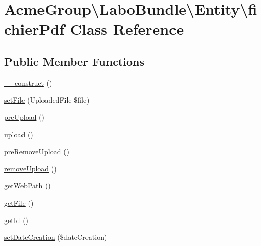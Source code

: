 \hypertarget{class_acme_group_1_1_labo_bundle_1_1_entity_1_1fichier_pdf}{\section{Acme\+Group\textbackslash{}Labo\+Bundle\textbackslash{}Entity\textbackslash{}fichier\+Pdf Class Reference}
\label{class_acme_group_1_1_labo_bundle_1_1_entity_1_1fichier_pdf}
}
\subsection*{Public Member Functions}
\begin{DoxyCompactItemize}
\item 
\hyperlink{class_acme_group_1_1_labo_bundle_1_1_entity_1_1fichier_pdf_af37823fdded25f3a8db29bda865a5673}{\+\_\+\+\_\+construct} ()
\item 
\hyperlink{class_acme_group_1_1_labo_bundle_1_1_entity_1_1fichier_pdf_a3497069b194044d645b2d25abcb3c7a9}{set\+File} (Uploaded\+File \$file)
\item 
\hyperlink{class_acme_group_1_1_labo_bundle_1_1_entity_1_1fichier_pdf_a5675adf79b6e4f9b102968c1516a8ca6}{pre\+Upload} ()
\item 
\hyperlink{class_acme_group_1_1_labo_bundle_1_1_entity_1_1fichier_pdf_a43559627e5b17d0ac1a6424dab754573}{upload} ()
\item 
\hyperlink{class_acme_group_1_1_labo_bundle_1_1_entity_1_1fichier_pdf_a3eec045a533bafbc9bdb98c05b7b62d5}{pre\+Remove\+Upload} ()
\item 
\hyperlink{class_acme_group_1_1_labo_bundle_1_1_entity_1_1fichier_pdf_a69dd972f51bff93a4034886730e7dd15}{remove\+Upload} ()
\item 
\hyperlink{class_acme_group_1_1_labo_bundle_1_1_entity_1_1fichier_pdf_a627e1bedecedccf02cc4da0820322895}{get\+Web\+Path} ()
\item 
\hyperlink{class_acme_group_1_1_labo_bundle_1_1_entity_1_1fichier_pdf_a826fc05f9a1ab1a3b5f9c68e8362c362}{get\+File} ()
\item 
\hyperlink{class_acme_group_1_1_labo_bundle_1_1_entity_1_1fichier_pdf_aed4767be15527eb0837ad130f916d00d}{get\+Id} ()
\item 
\hyperlink{class_acme_group_1_1_labo_bundle_1_1_entity_1_1fichier_pdf_af370a4f8965e593848becf2fb01f1ec1}{set\+Date\+Creation} (\$date\+Creation)

\end{DoxyCompactItemize}
